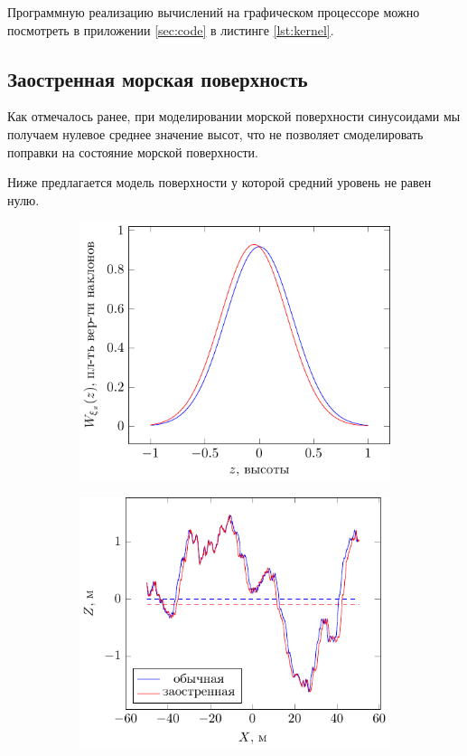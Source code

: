 Программную реализацию вычислений на графическом процессоре можно посмотреть в
приложении \ref{sec:code} в листинге \ref{lst:kernel}.

\subsection{Заостренная морская поверхность}
\label{sub:cwm}

Как отмечалось ранее, при моделировании морской поверхности синусоидами мы
получаем нулевое среднее значение высот, что не позволяет смоделировать
поправки на состояние морской поверхности. 

Ниже предлагается модель поверхности у которой средний уровень не равен нулю.

 \begin{figure}[h!]
    \centering
     \begin{subfigure}{0.49\linewidth}
        \centering
        \includegraphics[]{fig/water/pdf_cwm}
        \caption{}
    \end{subfigure}
    \hfill
     \begin{subfigure}{0.49\linewidth}
        \centering
        \includegraphics[]{fig/water/surface_cwm.pdf}

\end{subfigure}
\end{figure}
